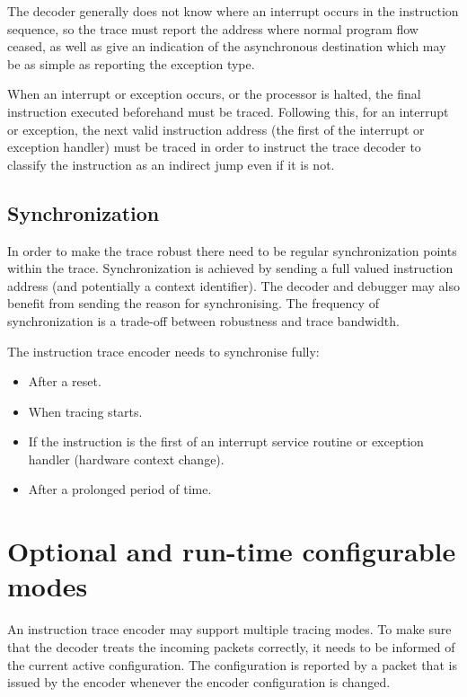 The decoder generally does not know
where an interrupt occurs in the instruction sequence, so the trace
must report the address where normal program flow ceased, as well as
give an indication of the asynchronous destination which may be as
simple as reporting the exception type.

When an interrupt or
exception occurs, or the processor is halted, the final instruction
executed beforehand must be traced.  Following this, for an interrupt
or exception, the next valid instruction address (the first of the
interrupt or exception handler) must be traced in order to instruct the
trace decoder to classify the instruction as an indirect jump even
if it is not.

\subsection{Synchronization} \label{synchronization}

In order to make the trace robust there need to be regular
synchronization points within the trace. Synchronization is achieved by
sending a full valued instruction address (and potentially a context
identifier). The decoder and debugger may also benefit from sending
the reason for synchronising. The frequency of synchronization is a
trade-off between robustness and trace bandwidth.

The instruction trace encoder needs to synchronise fully:

\begin{itemize}

\item After a reset.
\item When tracing starts.
\item If the instruction is the first of an interrupt service routine or
exception handler (hardware context change).
\item After a prolonged period of time.
\end{itemize}

\section{Optional and run-time configurable modes} \label{optional}

An instruction trace encoder may support multiple tracing modes.
To make sure that the decoder treats the incoming packets
correctly, it needs to be informed of the current active configuration.
The configuration is reported by a packet that is issued by the encoder
whenever the encoder configuration is changed.

